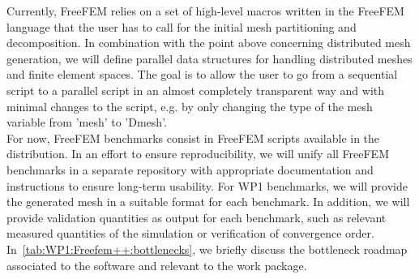 Currently, FreeFEM relies on a set of high-level macros written in the FreeFEM language that the user has to call for the initial mesh partitioning and decomposition. In combination with the point above concerning distributed mesh generation, we will define parallel data structures for handling distributed meshes and finite element spaces. The goal is to allow the user to go from a sequential script to a parallel script in an almost completely transparent way and with minimal changes to the script, e.g. by only changing the type of the mesh variable from 'mesh' to 'Dmesh'.\\

For now, FreeFEM benchmarks consist in FreeFEM scripts available in the distribution. In an effort to ensure reproducibility, we will unify all FreeFEM benchmarks in a separate repository with appropriate documentation and instructions to ensure long-term usability. For WP1 benchmarks, we will provide the generated mesh in a suitable format for each benchmark. In addition, we will provide validation quantities as output for each benchmark, such as relevant measured quantities of the simulation or verification of convergence order.\\

In~\cref{tab:WP1:Freefem++:bottlenecks}, we briefly discuss the bottleneck roadmap associated to the software and relevant to the work package.

